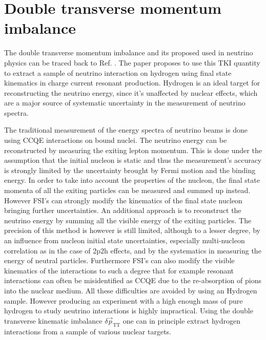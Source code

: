 \section{Double transverse momentum imbalance}
\label{sec:DoubleTKI}
The double transverse momentum imbalance and its proposed used in neutrino physics can be traced back to Ref. \cite{PhysRevC.94.015503}. The paper proposes to use this TKI quantity to extract a sample of neutrino interaction on hydrogen using final state kinematics in charge current resonant production. Hydrogen is an ideal target for reconstructing the neutrino energy, since it's unaffected by nuclear effects, which are a major source of systematic uncertainty in the measurement of neutrino spectra. 

The traditional measurement of the energy spectra of neutrino beams is done using CCQE interactions on bound nuclei. The neutrino energy can be reconstructed by measuring the exiting lepton momentum. This is done under the assumption that the initial nucleon is static and thus the measurement's accuracy is strongly limited by the uncertainty brought by Fermi motion and the binding energy.  In order to take into account the properties of the nucleon, the final state momenta of all the exiting particles can be measured and summed up instead. However FSI's can strongly modify the kinematics of the final state nucleon bringing further uncertainties. An additional approach is to reconstruct the neutrino energy by summing all the visible energy of the exiting particles. The precision of this method is however is still limited, although to a lesser degree, by an influence from nucleon initial state uncertainties, especially multi-nucleon correlation as in the case of 2p2h effects, and by the systematics in measuring the energy of neutral particles. Furthermore FSI's can also modify the visible kinematics of the interactions to such a degree that for example resonant interactions can often be misidentified as CCQE due to the re-absorption of pions into the nuclear medium.  All these difficulties are avoided by using an Hydrogen sample. However producing an experiment with a high enough mass of pure hydrogen to study neutrino interactions is highly impractical. Using the double transverse kinematic imbalance $\delta \Vec{p}_\text{TT}$ one can in principle extract hydrogen interactions from a sample of various nuclear targets.

